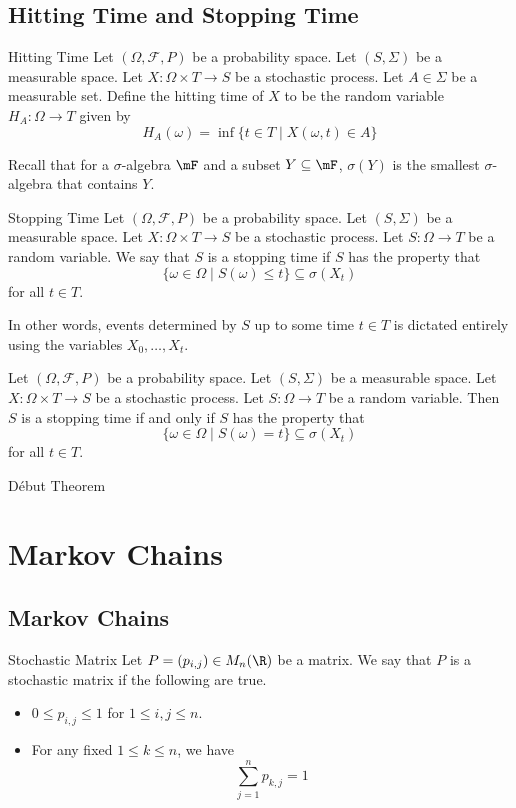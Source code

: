 \documentclass[a4paper]{article}
\begin{document}
\subsection{Hitting Time and Stopping Time}
\begin{defn}{Hitting Time}{} Let $(\Omega,\mathcal{F},P)$ be a probability space. Let $(S,\Sigma)$ be a measurable space. Let $X:\Omega\times T\to S$ be a stochastic process. Let $A\in\Sigma$ be a measurable set. Define the hitting time of $X$ to be the random variable $H_A:\Omega\to T$ given by $$H_A(\omega)=\inf\{t\in T\;|\;X(\omega,t)\in A\}$$
\end{defn}

Recall that for a $\sigma$-algebra $\mF$ and a subset $Y\subseteq\mF$, $\sigma(Y)$ is the smallest $\sigma$-algebra that contains $Y$. 

\begin{defn}{Stopping Time}{} Let $(\Omega,\mathcal{F},P)$ be a probability space. Let $(S,\Sigma)$ be a measurable space. Let $X:\Omega\times T\to S$ be a stochastic process. Let $S:\Omega\to T$ be a random variable. We say that $S$ is a stopping time if $S$ has the property that $$\{\omega\in\Omega\;|\;S(\omega)\leq t\}\subseteq\sigma(X_t)$$ for all $t\in T$. 
\end{defn}

In other words, events determined by $S$ up to some time $t\in T$ is dictated entirely using the variables $X_0,\dots,X_t$. 

\begin{lmm}{}{} Let $(\Omega,\mathcal{F},P)$ be a probability space. Let $(S,\Sigma)$ be a measurable space. Let $X:\Omega\times T\to S$ be a stochastic process. Let $S:\Omega\to T$ be a random variable. Then $S$ is a stopping time if and only if $S$ has the property that $$\{\omega\in\Omega\;|\;S(\omega)=t\}\subseteq\sigma(X_t)$$ for all $t\in T$. 
\end{lmm}

\begin{thm}{Début Theorem}{}
\end{thm}

\pagebreak
\section{Markov Chains}
\subsection{Markov Chains}
\begin{defn}{Stochastic Matrix}{} Let $P=(p_{i,j})\in M_n(\R)$ be a matrix. We say that $P$ is a stochastic matrix if the following are true. 
\begin{itemize}
\item $0\leq p_{i,j}\leq 1$ for $1\leq i,j\leq n$. 
\item For any fixed $1\leq k\leq n$, we have $$\sum_{j=1}^np_{k,j}=1$$
\end{itemize}
\end{defn}
\end{document}
